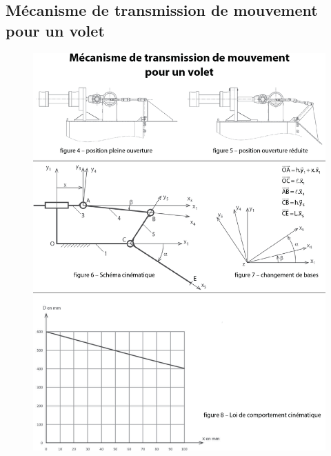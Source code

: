 \documentclass[10pt,fleqn]{article} %
\begin{document}
\subsection{\label{ann_03}Mécanisme de transmission de mouvement pour un volet}
\begin{figure}[H]
\centering
\includegraphics[width=\linewidth]{ann_c}
\end{figure}
\end{document}
